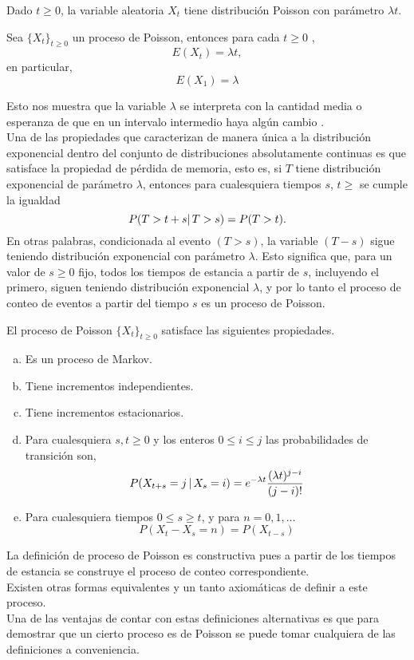     \begin{Prop}
        Dado $t\geq 0$, la variable aleatoria $X_t$ tiene distribución Poisson con parámetro $\lambda t$.
    \end{Prop}
   \begin{Cor}
   Sea $\{X_t\}_{t\geq 0}$ un proceso de Poisson, entonces para cada $t\geq 0$ , $$E(X_t)=\lambda t,$$ en particular, 
   $$E(X_1)=\lambda$$
   
   \end{Cor}
   Esto nos muestra que la variable $\lambda$ se interpreta con la cantidad media o esperanza de que en un intervalo intermedio haya algún cambio .\\
   Una de las propiedades que caracterizan de manera única a la distribución exponencial dentro del conjunto de distribuciones absolutamente continuas es que satisface la propiedad de pérdida de memoria, esto es, si $T$ tiene distribución exponencial de parámetro $\lambda$, entonces para cualesquiera tiempos $s$, $t\geq$ se cumple la igualdad $$P(T>t+s|\thinspace T>s)=P(T>t).$$
    En otras palabras, condicionada al evento $(T>s)$, la variable $(T-s)$ sigue teniendo distribución exponencial con parámetro $\lambda$.
    Esto significa que, para un valor de $s\geq 0$ fijo, todos los tiempos de estancia a partir de $s$, incluyendo el primero, siguen teniendo distribución exponencial $\lambda$, y por lo tanto el proceso de conteo de eventos a partir del tiempo $s$ es un proceso de Poisson.
    \begin{Prop} 
        El proceso de Poisson $\{X_t\}_{t\geq 0}$ satisface las siguientes
        propiedades.
        \label{prop_procPoisson_constructiva}
        \begin{enumerate}[a)]
            \item  Es un proceso de Markov.
            \item Tiene incrementos independientes.
            \item Tiene incrementos estacionarios.
            \item Para cualesquiera $s,t \geq 0$ y los enteros $0\leq i\leq j$ las probabilidades de transición son, $$P(X_{t+s}=j\thinspace|\thinspace X_s=i)= e^{-\lambda t}\frac{(\lambda t)^{j-i}}{(j-i)!}$$
            \item Para cualesquiera tiempos $0\leq s\geq t$, y para $n=0,1,\ldots$
            $$P(X_t-X_s=n)=P(X_{t-s})$$
        \end{enumerate}
    \end{Prop}
    La definición de proceso de Poisson es constructiva pues a partir de los
    tiempos de estancia se construye el proceso de conteo correspondiente.\\
    Existen otras formas equivalentes y un tanto axiomáticas de definir a este
    proceso.\\
    Una de las ventajas de contar con estas definiciones alternativas es que para demostrar que un cierto proceso es de Poisson se puede tomar cualquiera de las definiciones a conveniencia.\\
